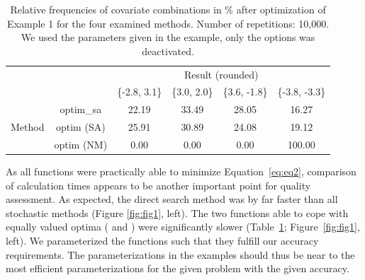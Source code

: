 \begin{table}[]
\centering
\caption{Relative frequencies of covariate combinations in \% after optimization of Example 1 for the four examined methods. Number of repetitions: 10,000. We used the parameters given in the example, only the  options was deactivated.}
\label{tab:tab1}
\begin{tabular}{cccccc} \cline{3-6}
& \multicolumn{1}{c}{} & \multicolumn{4}{c}{Result (rounded)}                    \\ \cline{3-6} 
&                      & \{-2.8, 3.1\} & \{3.0, 2.0\} & \{3.6, -1.8\} & \{-3.8, -3.3\} \\ \cline{2-6} 
\multirow{4}{*}{Method} & optim\_sa          & 22.19     & 33.49    & 28.05     & 16.27      \\
& optim (SA)            & 25.91     & 30.89    & 24.08     & 19.12      \\
& optim (NM)          & 0.00      & 0.00     & 0.00      & 100.00     \\ \cline{2-6} 
\end{tabular}
\end{table}

As all functions were practically able to minimize Equation~\eqref{eq:eq2}, comparison of calculation times appears to be another important point for quality assessment. As expected, the direct search method  was by far faster than all stochastic methods (Figure \ref{fig:fig1}, left). The two functions able to cope with equally valued optima ( and ) were significantly slower (Table~\ref{tab:tab1}; Figure~\ref{fig:fig1}, left). We parameterized the functions such that they fulfill our accuracy requirements. The parameterizations in the examples should thus be near to the most efficient parameterizations for the given problem with the given accuracy.

